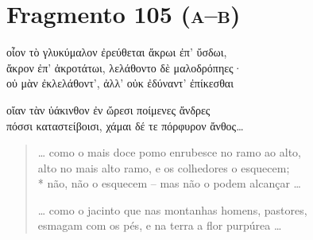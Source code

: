 \pagebreak
\section{Fragmento 105 (\textsc{a--b})}

\begin{gkverse}
οἶον τὸ γλυκύμαλον ἐρεύθεται ἄκρωι ἐπ’ ὔσδωι,\\
ἄκρον ἐπ’ ἀκροτάτωι, λελάθοντο δὲ μαλοδρόπηες·\\
οὐ μὰν ἐκλελάθοντ’, ἀλλ’ οὐκ ἐδύναντ’ ἐπίκεσθαι

\hspace*{35mm}

οἴαν τὰν ὐάκινθον ἐν ὤρεσι ποίμενες ἄνδρες\\
πόσσι καταστείβοισι, χάμαι δέ τε πόρφυρον ἄνθος\ldots{}

\end{gkverse}

\begin{verse}
\ldots{} como o mais doce pomo enrubesce no ramo ao alto,\\
alto no mais alto ramo, e os colhedores o esquecem;\\*
não, não o esquecem -- mas não o podem alcançar \ldots{}

\hspace*{35mm}

\ldots{} como o jacinto que nas montanhas homens, pastores,\\
esmagam com os pés, e na terra a flor purpúrea \ldots{}
\end{verse}

\medskip

